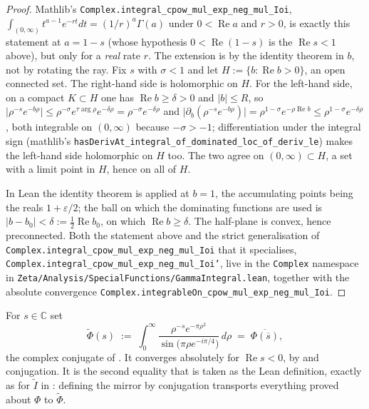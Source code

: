 \begin{proof}
\leanok
Mathlib's \texttt{Complex.integral\_cpow\_mul\_exp\_neg\_mul\_Ioi},
$\int_{(0,\infty)}t^{a-1}e^{-rt}dt=(1/r)^{a}\Gamma(a)$ under $0<\operatorname{Re}a$ and $r>0$,
is exactly this statement at $a=1-s$ (whose hypothesis $0<\operatorname{Re}(1-s)$ is the
$\operatorname{Re}s<1$ above), but only for a \emph{real} rate $r$.  The extension is by the
identity theorem in $b$, not by rotating the ray.  Fix $s$ with $\sigma<1$ and let
$H:=\{b:\operatorname{Re}b>0\}$, an open connected set.  The right-hand side is holomorphic
on $H$.  For the left-hand side, on a compact $K\subset H$ one has
$\operatorname{Re}b\ge\delta>0$ and $\lvert b\rvert\le R$, so
$\lvert\rho^{-s}e^{-b\rho}\rvert\le\rho^{-\sigma}e^{\tau\arg\rho}e^{-\delta\rho}
=\rho^{-\sigma}e^{-\delta\rho}$ and
$\lvert\partial_{b}(\rho^{-s}e^{-b\rho})\rvert=\rho^{1-\sigma}e^{-\rho\operatorname{Re}b}
\le\rho^{1-\sigma}e^{-\delta\rho}$, both
integrable on $(0,\infty)$ because $-\sigma>-1$; differentiation under the integral sign
(mathlib's \texttt{hasDerivAt\_integral\_of\_dominated\_loc\_of\_deriv\_le}) makes the
left-hand side holomorphic on $H$ too.  The two agree on $(0,\infty)\subset H$, a set with a
limit point in $H$, hence on all of $H$.

In Lean the identity theorem is applied at $b=1$, the accumulating points being the reals
$1+\varepsilon/2$; the ball on which the dominating functions are used is
$\lvert b-b_{0}\rvert<\delta:=\tfrac12\operatorname{Re}b_{0}$, on which
$\operatorname{Re}b\ge\delta$.  The half-plane is convex, hence preconnected.  Both the
statement above and the strict generalisation of
\texttt{Complex.integral\_cpow\_mul\_exp\_neg\_mul\_Ioi} that it specialises,
\texttt{Complex.integral\_cpow\_mul\_exp\_neg\_mul\_Ioi'}, live in the \texttt{Complex}
namespace in \texttt{Zeta/Analysis/SpecialFunctions/GammaIntegral.lean}, together with the
absolute convergence \texttt{Complex.integrableOn\_cpow\_mul\_exp\_neg\_mul\_Ioi}.
\end{proof}

\begin{definition}
\label{def:rsz_phi_mirror}
\leanok
{}
For $s\in\mathbb{C}$ set
\[
  \widetilde\Phi(s)\;:=\;\int_{0}^{\infty}
     \frac{\rho^{-s}e^{-\pi\rho^{2}}}{\sin\bigl(\pi\rho e^{-i\pi/4}\bigr)}\,d\rho
   \;=\;\overline{\Phi(\overline{s})} ,
\]
the complex conjugate of .  It converges absolutely for
$\operatorname{Re}s<0$, by  and conjugation.  It is the second equality
that is taken as the Lean definition, exactly as for $\widetilde I$ in :
defining the mirror by conjugation transports everything proved about $\Phi$ to
$\widetilde\Phi$.
\end{definition}

